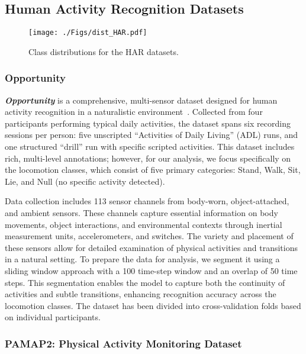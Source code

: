 \documentclass[twoside,11pt,preprint]{article}
\begin{document}
\subsection{Human Activity Recognition Datasets}

\begin{figure}[h]%
    \centering%
    \texttt{[image: ./Figs/dist\_HAR.pdf]}%
    \caption{Class distributions for the HAR datasets.}%
    \label{fig-class-dist-har}
\end{figure}%

\subsubsection{Opportunity}

\textbf{\textit{Opportunity}} is a comprehensive, multi-sensor dataset designed for human activity recognition in a naturalistic environment~\citep{Opportunity}. Collected from four participants performing typical daily activities, the dataset spans six recording sessions per person: five unscripted ``Activities of Daily Living'' (ADL) runs, and one structured ``drill'' run with specific scripted activities. This dataset includes rich, multi-level annotations; however, for our analysis, we focus specifically on the locomotion classes, which consist of five primary categories: Stand, Walk, Sit, Lie, and Null (no specific activity detected).

Data collection includes 113 sensor channels from body-worn, object-attached, and ambient sensors. These channels capture essential information on body movements, object interactions, and environmental contexts through inertial measurement units, accelerometers, and switches. The variety and placement of these sensors allow for detailed examination of physical activities and transitions in a natural setting. To prepare the data for analysis, we segment it using a sliding window approach with a 100 time-step window and an overlap of 50 time steps. This segmentation enables the model to capture both the continuity of activities and subtle transitions, enhancing recognition accuracy across the locomotion classes. The dataset has been divided into cross-validation folds based on individual participants.

\subsubsection{PAMAP2: Physical Activity Monitoring Dataset}
\end{document}
